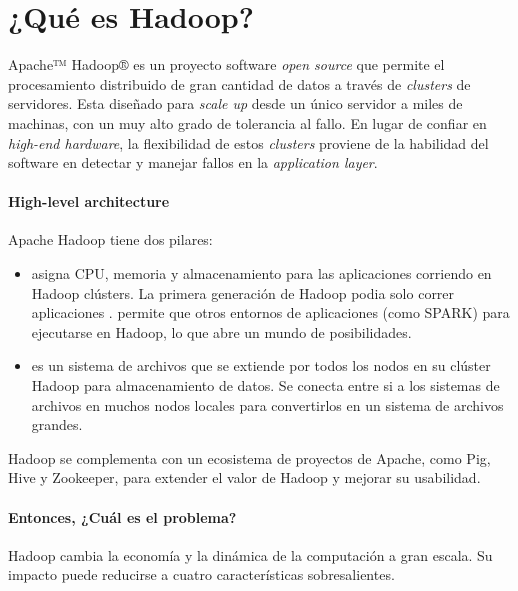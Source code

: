 \chapter{¿Qué es Hadoop? \cite{online_hadoop_description}}\label{ap:apendice_hadoop_description}
Apache™ Hadoop® es un proyecto software \textit{open source} que permite el procesamiento distribuido de gran cantidad de datos a través de \textit{clusters} de servidores. Esta diseñado para \textit{scale up} desde un único servidor a miles de machinas, con un muy alto grado de tolerancia al fallo. En lugar de confiar en \textit{high-end hardware}, la flexibilidad de estos \textit{clusters} proviene de la habilidad del software en detectar y manejar fallos en la \textit{application layer}.

\subsubsection*{High-level architecture} 
Apache Hadoop tiene dos pilares:

\begin{itemize}
	\item {} asigna CPU, memoria y almacenamiento para las aplicaciones corriendo en Hadoop clústers. La primera generación de Hadoop podia solo correr aplicaciones .  permite que otros entornos de aplicaciones (como SPARK) para ejecutarse en Hadoop, lo que abre un mundo de posibilidades.
	
	\item {} es un sistema de archivos que se extiende por todos los nodos en su clúster Hadoop para almacenamiento de datos. Se conecta entre si a los sistemas de archivos en muchos nodos locales para convertirlos en un sistema de archivos grandes.
\end{itemize}

Hadoop se complementa con un ecosistema de proyectos de Apache, como Pig\cite{online_ibm_meaning_pig}, Hive\cite{online_ibm_meaning_hive} y Zookeeper\cite{online_ibm_meaning_zookeeper}, para extender el valor de Hadoop y mejorar su usabilidad.


\subsubsection*{Entonces, ¿Cuál es el problema?}

Hadoop cambia la economía y la dinámica de la computación a gran escala. Su impacto puede reducirse a cuatro características sobresalientes.

